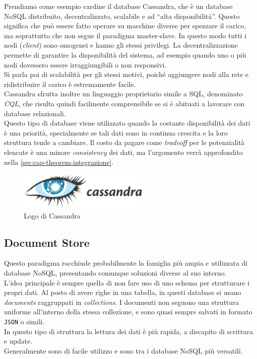 \noindent Prendiamo come esempio cardine il database Cassandra, che è un database NoSQL distribuito, decentralizzato, scalabile e ad ``alta disponibilità''. Questo significa che può essere fatto operare su macchine diverse per spezzare il carico, ma soprattutto che non segue il paradigma \gls{master-slave}. In questo modo tutti i nodi (\textit{client}) sono omogenei e hanno gli stessi privilegi. La decentralizzazione permette di garantire la disponibilità del sistema, ad esempio quando uno o più nodi dovessero essere irraggiungibili o non responsivi.\\
Si parla poi di scalabilità per gli stessi motivi, poiché aggiungere nodi alla rete e ridistribuire il carico è estremamente facile.\\
Cassandra sfrutta inoltre un linguaggio proprietario simile a \gls{SQL}, denominato \textit{CQL}, che risulta quindi facilmente comprensibile se si è abituati a lavorare con database relazionali.\\

\noindent Questo tipo di database viene utilizzato quando la costante disponibilità dei dati è una priorità, specialmente se tali dati sono in continua crescita e la loro struttura tende a cambiare. Il costo da pagare come \textit{tradeoff} per le potenzialità elencate è una minore \textit{consistency} dei dati, ma l'argomento verrà approfondito nella \autoref{sec:cap-theorem-integrazione}.

\begin{figure}[htbp]
\begin{center}
\includegraphics[height=5em]{immagini/tecnologies-logos/Cassandra-Logo-h.png}
\caption{Logo di Cassandra}
\end{center}
\end{figure}

\subsection{Document Store}
Questo paradigma racchiude probabilmente la famiglia più ampia e utilizzata di database NoSQL, presentando comunque soluzioni diverse al suo interno.\\
L'idea principale è sempre quella di non fare uso di uno schema per strutturare i propri dati. Al posto di avere righe in una tabella, in questi database si usano \textit{documents} raggruppati in \textit{collections}. I documenti non seguono una struttura uniforme all'interno della stessa collezione, e sono quasi sempre salvati in formato \texttt{JSON} o simili.\\
In questo tipo di struttura la lettura dei dati è più rapida, a discapito di scrittura e update.\\
Generalmente sono di facile utilizzo e sono tra i database NoSQL più versatili.\\

